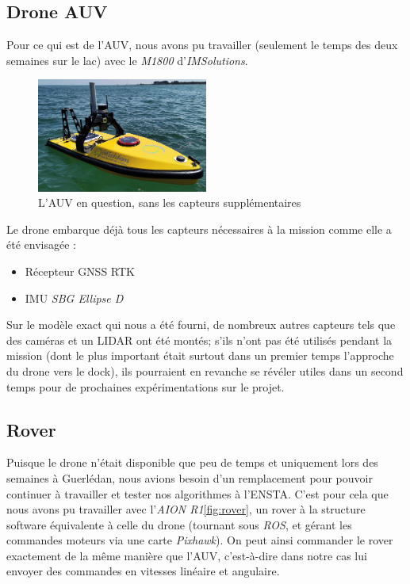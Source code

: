 \documentclass[12pt]{report}
\begin{document}
\subsection{Drone AUV}
Pour ce qui est de l'AUV, nous avons pu travailler (seulement le temps des deux semaines sur le lac) avec le \textit{M1800} d'\textit{IMSolutions}.
\begin{figure}[H]
    \centering
    \includegraphics[width=0.5\textwidth]{imgs/monodrone-1800-chenal.jpg}
    \caption{L'AUV en question, sans les capteurs supplémentaires}
\end{figure}
Le drone embarque déjà tous les capteurs nécessaires à la mission comme elle a été envisagée :

\begin{itemize}
    \item Récepteur GNSS RTK
    \item IMU \textit{SBG Ellipse D}
\end{itemize}

Sur le modèle exact qui nous a été fourni, de nombreux autres capteurs tels que des caméras et un LIDAR ont été montés; s'ils n'ont pas été utilisés pendant la mission (dont le plus important était surtout dans un premier temps l'approche du drone vers le dock), ils pourraient en revanche se révéler utiles dans un second temps pour de prochaines expérimentations sur le projet.
\subsection{Rover}

Puisque le drone n'était disponible que peu de temps et uniquement lors des semaines à Guerlédan, nous avions besoin d'un remplacement pour pouvoir continuer à travailler et tester nos algorithmes à l'ENSTA. C'est pour cela que nous avons pu travailler avec l'\textit{AION R1}\ref{fig:rover}, un rover à la structure software équivalente à celle du drone (tournant sous \textit{ROS}, et gérant les commandes moteurs via une carte \textit{Pixhawk}). On peut ainsi commander le rover exactement de la même manière que l'AUV, c'est-à-dire dans notre cas lui envoyer des commandes en vitesses linéaire et angulaire.
\end{document}

